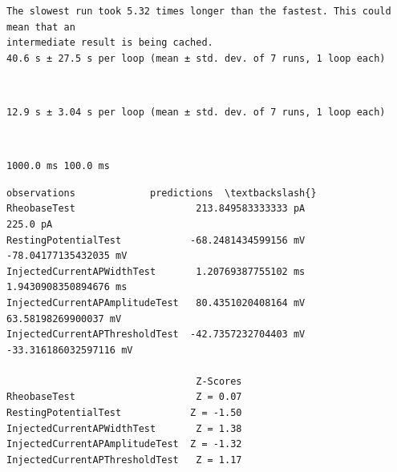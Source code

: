     \begin{Verbatim}[commandchars=\\\{\}]
The slowest run took 5.32 times longer than the fastest. This could mean that an
intermediate result is being cached.
40.6 s ± 27.5 s per loop (mean ± std. dev. of 7 runs, 1 loop each)
    \end{Verbatim}

    \begin{center}
    \end{center}
    { \hspace*{\fill} \\}
    
    \begin{Verbatim}[commandchars=\\\{\}]
12.9 s ± 3.04 s per loop (mean ± std. dev. of 7 runs, 1 loop each)
    \end{Verbatim}

    \begin{center}
    \end{center}
    { \hspace*{\fill} \\}
    
    \begin{Verbatim}[commandchars=\\\{\}]
1000.0 ms 100.0 ms
    \end{Verbatim}

            \begin{tcolorbox}[breakable, size=fbox, boxrule=.5pt, pad at break*=1mm, opacityfill=0]
\begin{Verbatim}[commandchars=\\\{\}]
                                        observations             predictions  \textbackslash{}
RheobaseTest                     213.849583333333 pA                225.0 pA
RestingPotentialTest            -68.2481434599156 mV   -78.04177135432035 mV
InjectedCurrentAPWidthTest       1.20769387755102 ms   1.9430908350894676 ms
InjectedCurrentAPAmplitudeTest   80.4351020408164 mV    63.58198269900037 mV
InjectedCurrentAPThresholdTest  -42.7357232704403 mV  -33.316186032597116 mV

                                 Z-Scores
RheobaseTest                     Z = 0.07
RestingPotentialTest            Z = -1.50
InjectedCurrentAPWidthTest       Z = 1.38
InjectedCurrentAPAmplitudeTest  Z = -1.32
InjectedCurrentAPThresholdTest   Z = 1.17
\end{Verbatim}
\end{tcolorbox}
        
